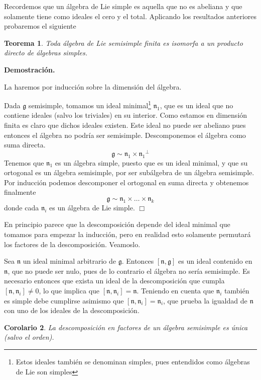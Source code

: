 \documentclass[a4paper,draft,12pt]{scrartcl}
\newtheorem{teo}{Teorema}[section]%
\newtheorem{cor}[teo]{Corolario}%
\newcommand{\dem}{\noindent \textbf{Demostración. }\vspace{0.3 cm}}%
\newcommand{\g}{\mathfrak{g}}%
\newcommand{\fin}{ $\Box $ \vspace{0.4 cm}}
\begin{document}
Recordemos que un álgebra de Lie simple es aquella que no es abeliana y que solamente tiene como ideales el cero y el total.  Aplicando los resultados anteriores probaremos el siguiente

\begin{teo}

Toda álgebra de Lie semisimple finita es isomorfa a un producto directo de álgebras simples.

\end{teo}

\dem

La haremos por inducción sobre la dimensión del álgebra.

Dada $\g$ semisimple, tomamos un ideal minimal\footnote{Estos ideales también se denominan simples, pues entendidos como álgebras de Lie son simples} $\mathfrak{n}_1$, que es un ideal que no contiene ideales (salvo los triviales) en su interior.  Como estamos en dimensión finita es claro que dichos ideales existen.  Este ideal no puede ser abeliano pues entonces el álgebra no podría ser semisimple.  Descomponemos el álgebra como suma directa.
$$
\g \sim \mathfrak{n}_1 \times {\mathfrak{n}_1}^\perp
$$
Tenemos que $\mathfrak{n}_1$ es un álgebra simple, puesto que es un ideal minimal,  y que su ortogonal es un álgebra semisimple, por ser subálgebra de un álgebra semisimple.  Por inducción podemos descomponer el ortogonal en suma directa y obtenemos finalmente
$$
\g \sim \mathfrak{n}_1 \times \dots \times  \mathfrak{n}_k
$$
donde cada $\mathfrak{n}_i$ es un álgebra de Lie simple.  \fin

En principio parece que la descomposición depende del ideal minimal que tomamos para empezar la inducción, pero en realidad esto solamente permutará los factores de la descomposición.  Veamoslo.

Sea $\mathfrak{n}$ un ideal minimal arbitrario de $\g$.  Entonces $[\mathfrak{n}, \g]$ es un ideal contenido en $\mathfrak{n}$, que no puede ser nulo, pues de lo contrario el álgebra no sería semisimple.  Es necesario entonces que exista  un ideal de la descomposición que cumpla $[\mathfrak{n},\mathfrak{n}_i]\neq 0$, lo que implica que $[\mathfrak{n},\mathfrak{n}_i]= \mathfrak{n}$. Teniendo en cuenta que $\mathfrak{n}_i$ también es simple debe cumplirse asimismo que $[\mathfrak{n},\mathfrak{n}_i]= \mathfrak{n}_i$, que prueba la igualdad de $\mathfrak{n}$ con uno de los ideales de la descomposición.

\begin{cor}

La descomposición en factores de un álgebra semisimple es úni\-ca (salvo el orden).

\end{cor}
\end{document}
